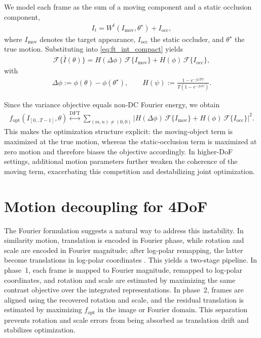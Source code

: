 \documentclass{article}
\begin{document}
We model each frame as the sum of a moving component and a static occlusion component,
\begin{align}
I_t = W^t(I_{\mathrm{mov}},\theta^\star) + I_{\mathrm{occ}},
\end{align}
where $I_{\mathrm{mov}}$ denotes the target appearance, $I_{\mathrm{occ}}$ the static occluder, and $\theta^\star$ the true motion. Substituting into \eqref{eq:ft_int_compact} yields
\begin{align}
\mathcal{F}\{\bar{I}(\theta)\}
=
H(\Delta\phi)\,\mathcal{F}\{I_{\mathrm{mov}}\}
+
H(\phi)\,\mathcal{F}\{I_{\mathrm{occ}}\},
\label{eq:ft_barI_final}
\end{align}
with
\begin{align}
\Delta\phi := \phi(\theta)-\phi(\theta^\star),\qquad
H(\psi):=\frac{1-e^{-j\omega T\psi}}{T(1-e^{-j\omega\psi})}.
\end{align}

Since the variance objective equals non-DC Fourier energy, we obtain
\begin{align}
f_{\mathrm{opt}}(I_{[0\dots T-1]},\theta)
\overset{\mathrm{DFT}}{\leftrightarrow}
\sum_{(m,n)\neq(0,0)}
\left|
H(\Delta\phi)\,\mathcal{F}\{I_{\mathrm{mov}}\}
+
H(\phi)\,\mathcal{F}\{I_{\mathrm{occ}}\}
\right|^2.
\label{eq:fourier_obj}
\end{align}
This makes the optimization structure explicit: the moving-object term is maximized at the true motion, whereas the static-occlusion term is maximized at zero motion and therefore biases the objective accordingly. In higher-DoF settings, additional motion parameters further weaken the coherence of the moving term, exacerbating this competition and destabilizing joint optimization.

\section{Motion decoupling for 4DoF}
The Fourier formulation suggests a natural way to address this instability. In similarity motion, translation is encoded in Fourier phase, while rotation and scale are encoded in Fourier magnitude; after log-polar remapping, the latter become translations in log-polar coordinates \cite{reddy1996fft,egomotion}. This yields a two-stage pipeline. In phase~1, each frame is mapped to Fourier magnitude, remapped to log-polar coordinates, and rotation and scale are estimated by maximizing the same contrast objective over the integrated representations. In phase~2, frames are aligned using the recovered rotation and scale, and the residual translation is estimated by maximizing $f_{\mathrm{opt}}$ in the image or Fourier domain. This separation prevents rotation and scale errors from being absorbed as translation drift and stabilizes optimization.
\end{document}
